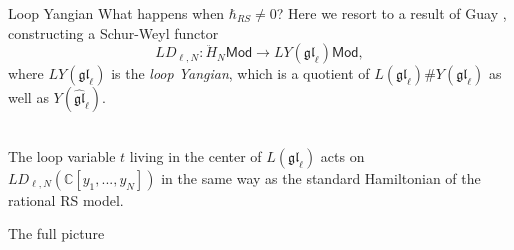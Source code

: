 \documentclass[11pt]{beamer}
\theoremstyle{remark}
\theoremstyle{remark}
\newcommand{\C}{\mathbb{C}}
\begin{document}
\begin{frame}{Loop Yangian}
What happens when $\hbar_{RS} \neq 0$? Here we resort to a result of Guay \cite{article:guay:2005}, constructing a Schur-Weyl functor
\begin{equation*}
LD_{\ell,N}: \ddot H_N\mathsf{Mod} \to LY(\mathfrak{gl}_\ell)\mathsf{Mod},
\end{equation*}
where $LY(\mathfrak{gl}_\ell)$ is the \emph{loop Yangian}, which is a quotient of $L(\mathfrak{gl}_\ell) \# Y(\mathfrak{gl}_\ell)$ as well as $Y(\widehat{\mathfrak{gl}}_\ell)$.
\\~\\
\begin{theorem}
The loop variable $t$ living in the center of $L(\mathfrak{gl}_\ell)$ acts on $LD_{\ell,N}(\C[y_1,...,y_N])$ in the same way as the standard Hamiltonian of the rational RS model.
\end{theorem}
\end{frame}

\begin{frame}[fragile]{The full picture}
\begin{center}
\end{center}
\end{frame}
\end{document}
